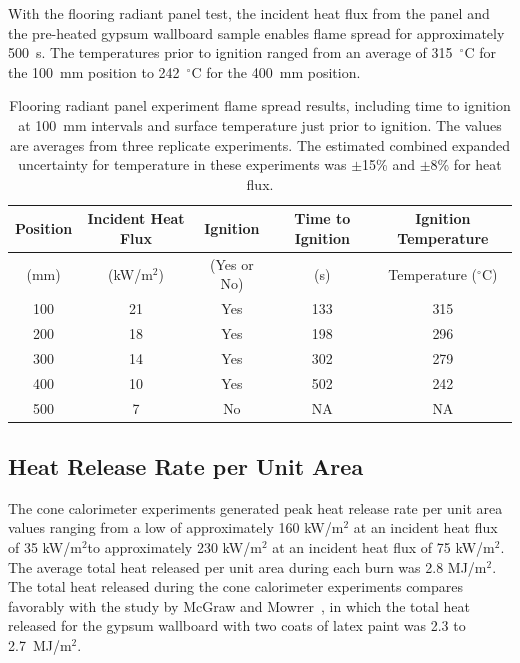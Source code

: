 \documentclass[twoside]{uocthesis}
\begin{document}
{ With the flooring radiant panel test, the incident heat flux from the panel and the pre-heated gypsum wallboard sample enables flame spread for approximately 500~s.  The temperatures prior to ignition ranged from an average of 315~$^{\circ}$C for the 100~mm position to 242~$^{\circ}$C for the 400~mm position.      
 
      
\begin{table}
	\centering
	\small
	\begin{tabular}{|c|c|c|c|c|}
		\hline Position & Incident Heat Flux & Ignition & Time to Ignition & Ignition Temperature \\
		\hline (mm) & (kW/m$^2$) & (Yes or No) & (s)  & Temperature ($^{\circ}$C)   \\ 
		\hline 100 	& 21	& Yes 	& 133	& 315 	 \\
		\hline 200	& 18 	& Yes 	& 198 	& 296 	 \\
		\hline 300	& 14	& Yes 	& 302 	& 279 	 \\
		\hline 400	& 10	& Yes 	& 502 	& 242 	 \\
		\hline 500	&  7	& No 	& NA 	& NA   	 \\
		\hline
	\end{tabular}
	\caption[Flooring radiant panel experiment flame spread results]{Flooring radiant panel experiment flame spread results, including time to ignition at 100~mm intervals and surface temperature just prior to ignition.  The values are averages from three replicate experiments.  The estimated combined expanded uncertainty for temperature in these experiments was $\pm$15\% and $\pm$8\% for heat flux.}
	\label{tab:FRP_timetemp}
\end{table}

\subsection{Heat Release Rate per Unit Area}

The cone calorimeter experiments generated peak heat release rate per unit area values ranging from a low of approximately 160 kW/m$^2$ at an incident heat flux of 35 kW/m$^2$to approximately 230 kW/m$^2$ at an incident heat flux of 75 kW/m$^2$.  The average total heat released per unit area during each burn was 2.8 MJ/m$^2$.  The total heat released during the cone calorimeter experiments compares favorably with the study by McGraw and Mowrer~\cite{McGraw:1999}, in which the total heat released for the gypsum wallboard with two coats of latex paint was 2.3 to 2.7~MJ/m$^2$.      

}
\end{document}
